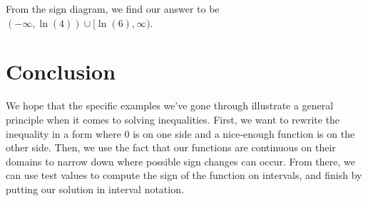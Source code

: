 \documentclass[noauthor, nooutcomes]{ximera}
\begin{document}
\begin{explanation}
\begin{image}
\end{image}


From the sign diagram, we find our answer to be $(-\infty,\ln(4)) \cup [\ln(6), \infty)$.
\end{explanation}

\section{Conclusion}
We hope that the specific examples we've gone through illustrate a general principle when it comes to solving inequalities. First, we want to rewrite the inequality in a form where 0 is on one side and a nice-enough function is on the other side. Then, we use the fact that our functions are continuous on their domains to narrow down where possible sign changes can occur. From there, we can use test values to compute the sign of the function on intervals, and finish by putting our solution in interval notation. 
\end{document}
